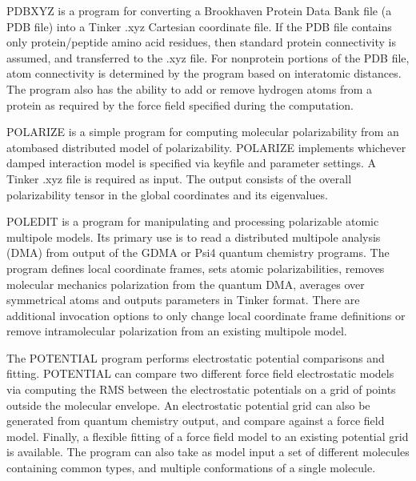 \documentclass[letterpaper,11pt,english]{sphinxmanual}
\begin{document}

PDBXYZ is a program for converting a Brookhaven Protein Data Bank file (a PDB file) into a Tinker .xyz Cartesian coordinate file. If the PDB file contains only protein/peptide amino acid residues, then standard protein connectivity is assumed, and transferred to the .xyz file. For non\sphinxhyphen{}protein portions of the PDB file, atom connectivity is determined by the program based on interatomic distances. The program also has the ability to add or remove hydrogen atoms from a protein as required by the force field specified during the computation.


POLARIZE is a simple program for computing molecular polarizability from an atom\sphinxhyphen{}based distributed model of polarizability. POLARIZE implements whichever damped interaction model is specified via keyfile and parameter settings. A Tinker .xyz file is required as input. The output consists of the overall polarizability tensor in the global coordinates and its eigenvalues.


POLEDIT is a program for manipulating and processing polarizable atomic multipole models. Its primary use is to read a distributed multipole analysis (DMA) from output of the GDMA or Psi4 quantum chemistry programs. The program defines local coordinate frames, sets atomic polarizabilities, removes molecular mechanics polarization from the quantum DMA, averages over symmetrical atoms and outputs parameters in Tinker format. There are additional invocation options to only change local coordinate frame definitions or remove intramolecular polarization from an existing multipole model.


The POTENTIAL program performs electrostatic potential comparisons and fitting. POTENTIAL can compare two different force field electrostatic models via computing the RMS between the electrostatic potentials on a grid of points outside the molecular envelope. An electrostatic potential grid can also be generated from quantum chemistry output, and compare against a force field model. Finally, a flexible fitting of a force field model to an existing potential grid is available. The program can also take as model input a set of different molecules containing common types, and multiple conformations of a single molecule.
\end{document}
